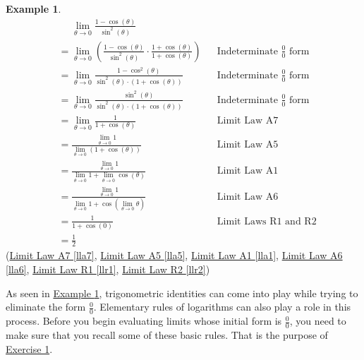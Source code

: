 \documentclass[10pt,oneside,]{book}
\theoremstyle{plain}
\theoremstyle{definition}
\newtheorem{example}[theorem]{Example}
\numberwithin{equation}{section}
\newcommand{\fe}[2]{#1\mathopen{}\left(#2\right)\mathclose{}}
\begin{document}
\begin{example}\label{example-second-indeterminate}
\begin{align*}
&\phantom{{}={}}\lim_{\theta\to0}\frac{1-\fe{\cos}{\theta}}{\fe{\sin^2}{\theta}}\\
&=\lim_{\theta\to0}\left(\frac{1-\fe{\cos}{\theta}}{\fe{\sin^2}{\theta}}\cdot\frac{1+\fe{\cos}{\theta}}{1+\fe{\cos}{\theta}}\right)&&\text{Indeterminate $\frac{0}{0}$ form}\\
&=\lim_{\theta\to0}\frac{1-\fe{\cos^2}{\theta}}{\fe{\sin^2}{\theta}\cdot\left(1+\fe{\cos}{\theta}\right)}&&\text{Indeterminate $\frac{0}{0}$ form}\\
&=\lim_{\theta\to0}\frac{\fe{\sin^2}{\theta}}{\fe{\sin^2}{\theta}\cdot\left(1+\fe{\cos}{\theta}\right)}&&\text{Indeterminate $\frac{0}{0}$ form}\\
&=\lim_{\theta\to0}\frac{1}{1+\fe{\cos}{\theta}}&&\text{Limit Law A7}\\
&=\frac{\lim_{\theta\to0}1}{\lim_{\theta\to0}\left(1+\fe{\cos}{\theta}\right)}&&\text{Limit Law A5}\\
&=\frac{\lim_{\theta\to0}1}{\lim_{\theta\to0}1+\lim_{\theta\to0}\fe{\cos}{\theta}}&&\text{Limit Law A1}\\
&=\frac{\lim_{\theta\to0}1}{\lim_{\theta\to0}1+\fe{\cos}{\lim_{\theta\to0}\theta}}&&\text{Limit Law A6}\\
&=\frac{1}{1+\fe{\cos}{0}}&&\text{Limit Laws R1 and R2}\\
&=\frac{1}{2}
\end{align*}(\hyperref[lla7]{Limit Law A7 \ref{lla7}}, \hyperref[lla5]{Limit Law A5 \ref{lla5}}, \hyperref[lla1]{Limit Law A1 \ref{lla1}}, \hyperref[lla6]{Limit Law A6 \ref{lla6}}, \hyperref[llr1]{Limit Law R1 \ref{llr1}}, \hyperref[llr2]{Limit Law R2 \ref{llr2}})%
\end{example}
\par
As seen in \hyperref[example-second-indeterminate]{Example \ref{example-second-indeterminate}}, trigonometric identities can come into play while trying to eliminate the form \(\frac{0}{0}\). Elementary rules of logarithms can also play a role in this process. Before you begin evaluating limits whose initial form is \(\frac{0}{0}\), you need to make sure that you recall some of these basic rules. That is the purpose of \hyperlink{exercise-identities-review}{Exercise 1}.%
\typeout{************************************************}
\typeout{************************************************}
\end{document}
